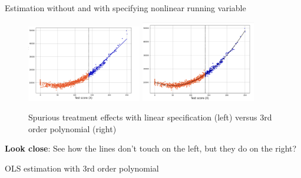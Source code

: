 \documentclass{beamer}
\begin{document}
\begin{frame}{Estimation without and with specifying nonlinear running variable}
\begin{figure}
    \centering
    \includegraphics[width=5cm]{./lecture_includes/linear_estimation.png}
    \qquad
    \includegraphics[width=5cm]{./lecture_includes/nonlinear_estimation.png}
    \caption{Spurious treatment effects with linear specification (left) versus 3rd order polynomial (right)}
\end{figure}

\textbf{Look close}: See how the lines don't touch on the left, but they do on the right?  

\end{frame}


\begin{frame}{OLS estimation with 3rd order polynomial}
	
	\begin{figure}
	\end{figure}

	
\end{frame}
\end{document}
